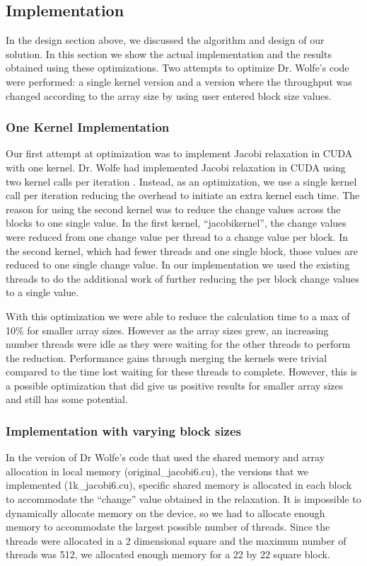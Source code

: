 \documentclass[10pt]{article}
\begin{document}
\begin{multicols}{2}
  \subsection{Implementation}
  In the design section above, we discussed the algorithm and design of our solution.
  In this section we show the actual implementation and the results obtained using these optimizations.
  Two attempts to optimize Dr. Wolfe's code \cite{bib:wolfe} were performed: a single kernel version and a version where the throughput was changed according to the array size by using user entered block size values.

  \subsubsection{One Kernel Implementation}
  Our first attempt at optimization was to implement Jacobi relaxation in CUDA with one kernel.
  Dr. Wolfe had implemented Jacobi relaxation in CUDA using two kernel calls per iteration \cite{bib:wolfe}.
  Instead, as an optimization, we use a single kernel call per iteration reducing the overhead to initiate an extra kernel each time.
  The reason for using the second kernel was to reduce the change values across the blocks to one single value.
  In the first kernel, ``jacobikernel'', the change values were reduced from one change value per thread to a change value per block.
  In the second kernel, which had fewer threads and one single block, those values are reduced to one single change value.
  In our implementation we used the existing threads to do the additional work of further reducing the per block change values to a single value.

  With this optimization we were able to reduce the calculation time to a max of 10\% for smaller array sizes.
  However as the array sizes grew, an increasing number threads were idle as they were waiting for the other threads to perform the reduction.
   Performance gains through merging the kernels were trivial compared to the time lost waiting for these threads to complete.
  However, this is a possible optimization that did give us positive results for smaller array sizes and still has some potential.
  
  \subsubsection{Implementation with varying block sizes}
  In the version of Dr Wolfe's code that used the shared memory and array allocation in local memory (original\_jacobi6.cu), the versions that we implemented (1k\_jacobi6.cu), specific shared memory is allocated in each block to accommodate the ``change'' value obtained in the relaxation.
  It is impossible to dynamically allocate memory on the device, so we had to allocate enough memory to accommodate the largest possible number of threads.
  Since the threads were allocated in a 2 dimensional square and the maximum number of threads was 512, we allocated enough memory for a 22 by 22 square block.


\end{multicols}
\end{document}
